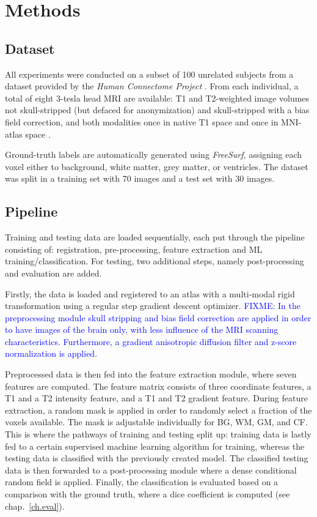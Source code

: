 \documentclass[journal]{IEEEtran}
\newcommand\FIXME[1]{\textcolor{blue}{FIXME: #1}}
\begin{document}
\section{Methods}

\subsection{Dataset}
All experiments were conducted on a subset of 100 unrelated subjects from a dataset provided by the \textit{Human Connectome Project} \cite{van2013wu}. From each individual, a total of eight 3-tesla head MRI are available: T1 and T2-weighted image volumes not skull-stripped (but defaced for anonymization) and skull-stripped with a bias field correction, and both modalities once in native T1 space and once in MNI-atlas space \cite{mazziotta2001probabilistic}.

Ground-truth labels are automatically generated using \textit{FreeSurf}, assigning each voxel either to background, white matter, grey matter, or ventricles. The dataset was split in a training set with 70 images and a test set with 30 images.

\subsection{Pipeline}

Training and testing data are loaded sequentially, each put through the pipeline consisting of: registration, pre-processing, feature extraction and ML training/classification. For testing, two additional steps, namely post-processing and evaluation are added.

Firstly, the data is loaded and registered to an atlas with a multi-modal rigid transformation using a regular step gradient descent optimizer. \FIXME{In the preprocessing module skull stripping and bias field correction are applied in order to have images of the brain only, with less influence of the MRI scanning characteristics. Furthermore, a gradient anisotropic diffusion filter and z-score normalization is applied.}

Preprocessed data is then fed into the feature extraction module, where seven features are computed. The feature matrix consists of three coordinate features, a T1 and a T2 intensity feature, and a T1 and T2 gradient feature. During feature extraction, a random mask is applied in order to randomly select a fraction of the voxels available. The mask is adjustable individually for BG, WM, GM, and CF. This is where the pathways of training and testing split up: training data is lastly fed to a certain supervised machine learning algorithm for training, whereas the testing data is classified with the previously created model. The classified testing data is then forwarded to a post-processing module where a dense conditional random field \cite{krahenbuhl2011efficient} is applied.
Finally, the classification is evaluated based on a comparison with the ground truth, where a dice coefficient is computed (see chap.~\ref{ch.eval}).
\end{document}
